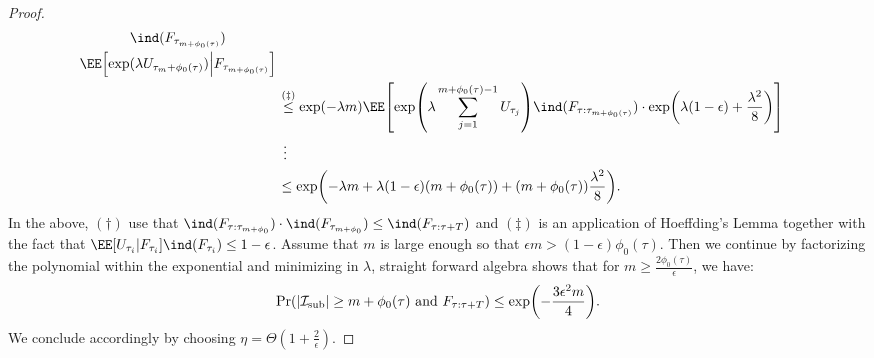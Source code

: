 \documentclass[preprint,cleveref,12pt]{colt2025}
\DeclarePairedDelimiter{\brackets}{[}{]}	%
\DeclarePairedDelimiter{\parens}{(}{)}	%
\DeclarePairedDelimiter{\abs}{\lvert}{\rvert}	%
\newcommand{\indic}[1]{\ind\parens{#1}}
\def\indicator{\indic}
\begin{document}
\begin{proof}
\begin{align*}
{{                    \indicator{F_{\tau_{m+\phi_0(\tau)}}}
                    \atop
                    \EE\brackets*{\exp(\lambda U_{\tau_m+\phi_0(\tau)}) \middle| F_{\tau_{m+\phi_0(\tau)}}}
                }
            }
            \\
            & \overset{(\ddagger)}\le
            \exp(- \lambda m)
            \EE \brackets*{
                \exp\parens*{\lambda\sum_{j=1}^{m + \phi_0(\tau)-1} U_{\tau_j}}
                \indicator{F_{\tau:\tau_{m+\phi_0(\tau)}}}
                \cdot
                \exp\parens*{\lambda(1-\epsilon) + \frac{\lambda^2}8}
            }
            \\
            & \hspace{0.4em}\vdots{}
            \\
            & \le
            \exp \parens*{
                - \lambda m + \lambda (1-\epsilon) (m+\phi_0(\tau)) + (m+\phi_0(\tau)) \frac{\lambda^2}8
            }
            .
        \end{align*}
        In the above, $(\dagger)$ use that $\indicator{F_{\tau:\tau_{m+\phi_0}}} \cdot \indicator{F_{\tau_{m+\phi_0}}} \le \indicator{F_{\tau:\tau+T}}$ and $(\ddagger)$ is an application of Hoeffding's Lemma together with the fact that $\EE[U_{\tau_i}|F_{\tau_i}] \indicator{F_{\tau_i}} \le 1-\epsilon$.
        Assume that $m$ is large enough so that $\epsilon m > (1-\epsilon) \phi_0(\tau)$.
        Then we continue by factorizing the polynomial within the exponential and minimizing in $\lambda$, straight forward algebra shows that for $m \ge \tfrac{2\phi_0(\tau)}\epsilon$, we have:
        \begin{equation}
            \Pr \parens*{
                \abs*{\mathcal{I}_\mathrm{sub}} \ge m + \phi_0(\tau)
                \text{~and~} F_{\tau:\tau+T}
            }
            \le 
            \exp \parens*{- \frac{3\epsilon^2m}{4}}.
        \end{equation}
        We conclude accordingly by choosing $\eta = \Theta(1 + \frac 2\epsilon)$. 
    \end{proof}
\end{document}
